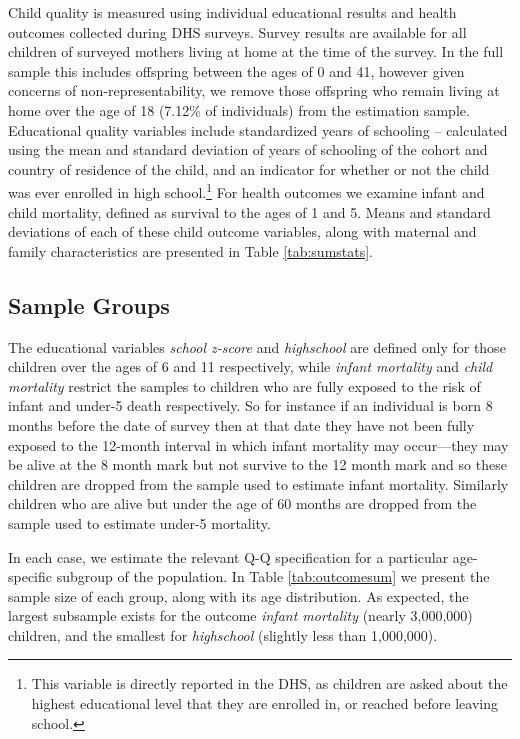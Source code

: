 \documentclass{article}[12pt,subeqn]
\begin{document}
\begin{spacing}{1.5}
Child quality is measured using individual educational results and health outcomes collected during DHS surveys. Survey results are available for all children of surveyed mothers living at home at the time of the survey.  In the full sample this includes offspring between the ages of 0 and 41, however given concerns of non-representability, we remove those offspring who remain living at home over the age of 18 (7.12\% of individuals) from the estimation sample.  Educational quality variables include standardized years of schooling -- calculated using the mean and standard deviation of years of schooling of the cohort and country of residence of the child, and an indicator for whether or not the child was ever enrolled in high school.\footnote{This variable is directly reported in the DHS, as children are asked about the highest educational level that they are enrolled in, or reached before leaving school.} For health outcomes we examine infant and child mortality, defined as survival to the ages of 1 and 5.  Means and standard deviations of each of these child outcome variables, along with maternal and family characteristics are presented in Table \ref{tab:sumstats}.

\subsection{Sample Groups}
The educational variables \emph{school z-score} and \emph{highschool} are defined only for those children over the ages of 6 and 11 respectively, while \emph{infant mortality} and \emph{child mortality} restrict the samples to children who are fully exposed to the risk of infant and under-5 death respectively. So for instance if an individual is born 8 months before the date of survey then at that date they have not been fully exposed to the 12-month interval in which infant mortality may occur---they may be alive at the 8 month mark but not survive to the 12 month mark and so these children are dropped from the sample used to estimate infant mortality. Similarly children who are alive but under the age of 60 months are dropped from the sample used to estimate under-5 mortality.

In each case, we estimate the relevant Q-Q specification for a particular age-specific subgroup of the population.  In Table \ref{tab:outcomesum} we present the sample size of each group, along with its age distribution.  As expected, the largest subsample exists for the outcome \emph{infant mortality} (nearly 3,000,000) children, and the smallest for \emph{highschool} (slightly less than 1,000,000).

\end{spacing}
\end{document}
